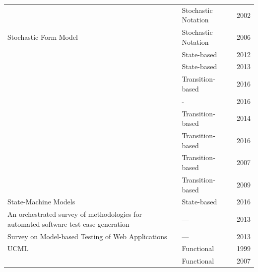 \documentclass[espaco=umemeio,chapter=TITLE,twoside,openright]{abnt}
\begin{document}
\begin{table}[h]
\begin{tabular}{|l|l|l|l|}
                                        
                                                                                & \cite{Menasce2002a}          & Stochastic Notation    & 2002          \\ \cline{2-4}
\multirow{-3}{*}{Stochastic Form Model} & \cite{Draheim2006b}     & Stochastic Notation     & 2006          \\ \hline
                                        & \cite{Fang2012}         & State-based          & 2012          \\ \cline{2-4}
                                        & \begin{minipage}{0.4\textwidth} \cite{Sridhar2013} \end{minipage}      & State-based          & 2013          \\ \cline{2-4}
                                        & \cite{Ganesan2016}      & Transition-based     & 2016          \\ \cline{2-4}
                                        & \cite{SanMiguel2016}    & -                    & 2016          \\ \cline{2-4}
                                        & \cite{Arantes2014}      & Transition-based     & 2014          \\ \cline{2-4}
                                        & \begin{minipage}{0.4\textwidth} \cite{Gay2016} \end{minipage}          & Transition-based     & 2016          \\ \cline{2-4}
                                        & \cite{Hessel2007}       & Transition-based     & 2007          \\ \cline{2-4}
                                        & \cite{Hierons2009}      & Transition-based     & 2009          \\ \cline{2-4}
\multirow{-9}{*}{State-Machine Models}  & \cite{Jeong2016}        & State-based          & 2016          \\ \hline
\begin{minipage} {.2\textwidth}
An orchestrated survey of methodologies for automated software test case generation \end{minipage}                           & \cite{Anand2013}        &   ---     & 2013          \\ \hline
\begin{minipage} {.2\textwidth}
Survey on Model-based Testing of Web Applications \end{minipage}                         &
\cite{Wang2013}    & ---          & 2013          \\ \hline
UCML                                        & \cite{Barber1999}       & Functional     & 1999          \\ \hline                                         & \cite{XinyingCai2007}   & Functional           & 2007          \\ \cline{2-4}
                              

\end{tabular}
\end{table}
\end{document}
